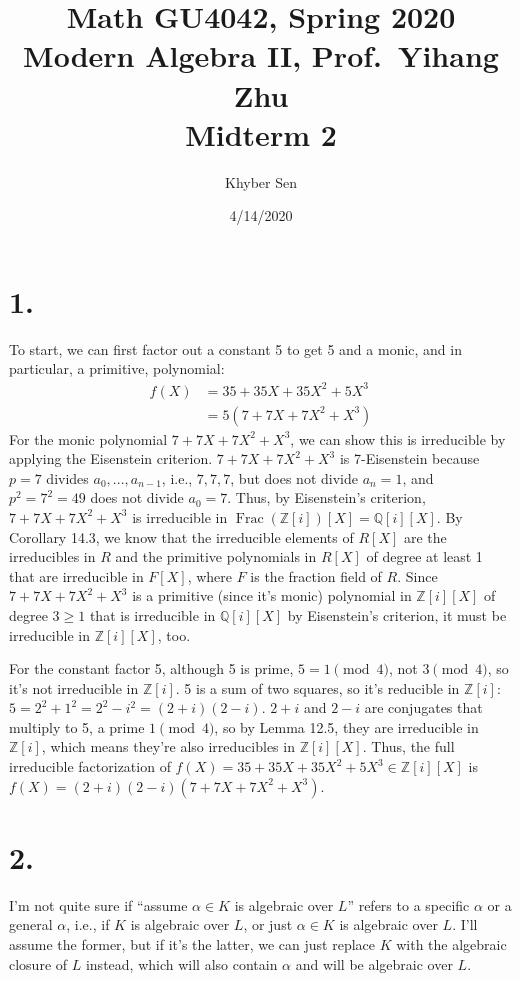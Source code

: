 \documentclass[fleqn]{article}
\title{
Math GU4042, Spring 2020 \\
Modern Algebra II, Prof.\ Yihang Zhu \\
Midterm 2
}
\author{Khyber Sen}
\date{4/14/2020}
\DeclareMathOperator{\Frac}{Frac}
\begin{document}
    \section{1.}
    
    To start, we can first factor out a constant 5 to get 5 and a monic, and in particular, a primitive, polynomial:
    \begin{align}
        f(X) &= 35 + 35X + 35X^2 + 5X^3 \\
            &= 5\left(7 + 7X + 7X^2 + X^3\right)
    \end{align}
    For the monic polynomial $7 + 7X + 7X^2 + X^3$, we can show this is irreducible by applying the Eisenstein criterion.  $7 + 7X + 7X^2 + X^3$ is 7-Eisenstein because $p = 7$ divides $a_0, ..., a_{n - 1}$, i.e., $7, 7, 7$, but does not divide $a_n = 1$, and $p^2 = 7^2 = 49$ does not divide $a_0 = 7$.  Thus, by Eisenstein's criterion, $7 + 7X + 7X^2 + X^3$ is irreducible in $\Frac(\mathbb{Z}[i])[X] = \mathbb{Q}[i][X]$.  By Corollary 14.3, we know that the irreducible elements of $R[X]$ are the irreducibles in $R$ and the primitive polynomials in $R[X]$ of degree at least 1 that are irreducible in $F[X]$, where $F$ is the fraction field of $R$.  Since $7 + 7X + 7X^2 + X^3$ is a primitive (since it's monic) polynomial in $\mathbb{Z}[i][X]$ of degree $3 \geq 1$ that is irreducible in $\mathbb{Q}[i][X]$ by Eisenstein's criterion, it must be irreducible in $\mathbb{Z}[i][X]$, too.
    
    For the constant factor 5, although 5 is prime, $5 = 1 \pmod{4}$, not $3 \pmod{4}$, so it's not irreducible in $\mathbb{Z}[i]$.  5 is a sum of two squares, so it's reducible in $\mathbb{Z}[i]$: $5 = 2^2 + 1^2 = 2^2 - i^2 = (2 + i)(2 - i)$.  $2 + i$ and $2 - i$ are conjugates that multiply to 5, a prime $1 \pmod{4}$, so by Lemma 12.5, they are irreducible in $\mathbb{Z}[i]$, which means they're also irreducibles in $\mathbb{Z}[i][X]$.  Thus, the full irreducible factorization of $f(X) = 35 + 35X + 35X^2 + 5X^3 \in \mathbb{Z}[i][X]$ is $f(X) = (2 + i)(2 - i)(7 + 7X + 7X^2 + X^3)$.
    
    \pagebreak
    
    \section{2.}
    
    I'm not quite sure if ``assume $\alpha \in K$ is algebraic over $L$'' refers to a specific $\alpha$ or a general $\alpha$, i.e., if $K$ is algebraic over $L$, or just $\alpha \in K$ is algebraic over $L$.  I'll assume the former, but if it's the latter, we can just replace $K$ with the algebraic closure of $L$ instead, which will also contain $\alpha$ and will be algebraic over $L$.
    
\end{document}
